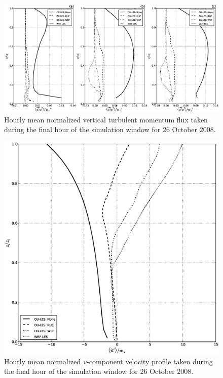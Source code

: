 \begin{figure}[H]
\begin{center}
\includegraphics[width=\textwidth]{figures/chapter6/stress13_20081026}
\end{center}
\caption{Hourly mean normalized vertical turbulent momentum flux taken during the final hour of the simulation window for 26 October 2008.}
\label{figure627}
\end{figure}



\begin{figure}[H]
\begin{center}
\includegraphics[width=\textwidth]{figures/chapter6/velocity_20081026}
\end{center}
\caption{Hourly mean normalized \textit{u}-component velocity profile taken during the final hour of the simulation window for 26 October 2008.}
\label{figure628}
\end{figure}
\newpage


